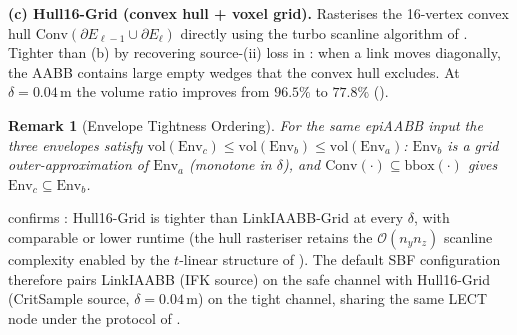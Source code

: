 \documentclass[journal]{IEEEtran}
\newtheorem{remark}{Remark}
\begin{document}
\textbf{(c) Hull16-Grid (convex hull + voxel grid).}
Rasterises the 16-vertex convex hull
$\mathrm{Conv}(\partial E_{\ell-1}\cup\partial E_\ell)$ directly using
the turbo scanline algorithm of . Tighter than (b) by
recovering source-(ii) loss in : when a link moves
diagonally, the AABB contains large empty wedges that the convex hull
excludes. At $\delta=0.04$\,m the volume ratio improves from $96.5\%$ to
$77.8\%$ ().

\begin{remark}[Envelope Tightness Ordering]\label{prop:env_order}
For the same epiAABB input the three envelopes satisfy
$\mathrm{vol}(\mathrm{Env}_c) \leq \mathrm{vol}(\mathrm{Env}_b)
\leq \mathrm{vol}(\mathrm{Env}_a)$:
$\mathrm{Env}_b$ is a grid outer-approximation of $\mathrm{Env}_a$
(monotone in $\delta$), and
$\mathrm{Conv}(\cdot)\subseteq\mathrm{bbox}(\cdot)$ gives
$\mathrm{Env}_c\subseteq\mathrm{Env}_b$.
\end{remark}

\begin{table}[ht]
\centering
\caption{LinkIAABB envelope design trade-offs}
\label{tab:env_compare}
\end{table}

 confirms : Hull16-Grid is
tighter than LinkIAABB-Grid at every $\delta$, with comparable or
lower runtime (the hull rasteriser retains the $\mathcal{O}(n_y n_z)$
scanline complexity enabled by the $t$-linear structure of
). The default SBF configuration therefore pairs
LinkIAABB (IFK source) on the safe channel with Hull16-Grid
(CritSample source, $\delta=0.04$\,m) on the tight channel, sharing the
same LECT node under the protocol of .

\end{document}
